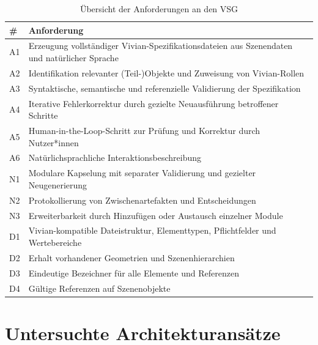 \begin{table}[h]
	\centering
	\begin{tabularx}{\linewidth}{lX}
		\toprule
		\textbf{\#} & \textbf{Anforderung}                                                                         \\
		\midrule
		A1          & Erzeugung vollständiger Vivian-Spezifikationsdateien aus Szenendaten und natürlicher Sprache \\
		A2          & Identifikation relevanter (Teil-)Objekte und Zuweisung von Vivian-Rollen                     \\
		A3          & Syntaktische, semantische und referenzielle Validierung der Spezifikation                    \\
		A4          & Iterative Fehlerkorrektur durch gezielte Neuausführung betroffener Schritte                  \\
		A5          & Human-in-the-Loop-Schritt zur Prüfung und Korrektur durch Nutzer*innen                       \\
		A6          & Natürlichsprachliche Interaktionsbeschreibung                                                \\
		\midrule
		N1          & Modulare Kapselung mit separater Validierung und gezielter Neugenerierung                    \\
		N2          & Protokollierung von Zwischenartefakten und Entscheidungen                                    \\
		N3          & Erweiterbarkeit durch Hinzufügen oder Austausch einzelner Module                             \\
		\midrule
		D1          & Vivian-kompatible Dateistruktur, Elementtypen, Pflichtfelder und Wertebereiche               \\
		D2          & Erhalt vorhandener Geometrien und Szenenhierarchien                                          \\
		D3          & Eindeutige Bezeichner für alle Elemente und Referenzen                                       \\
		D4          & Gültige Referenzen auf Szenenobjekte                                                         \\
		\bottomrule
	\end{tabularx}
	\caption{Übersicht der Anforderungen an den VSG}
	\label{tab:anforderungen}
\end{table}

\section{Untersuchte Architekturansätze}

